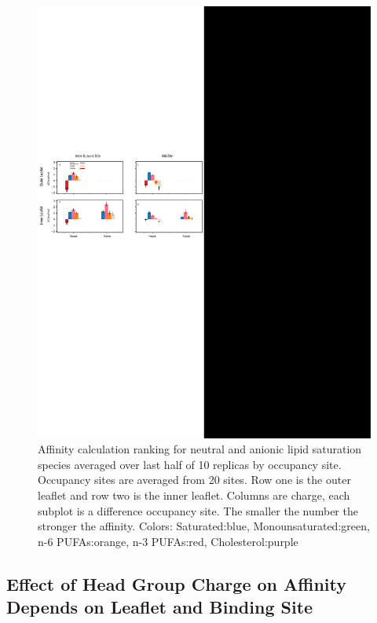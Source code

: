 \begin{figure}[!h]
	\center
	\includegraphics[width=\linewidth]{Figures/Lipid_centric.pdf}
	\caption[Affinity calculation ranking for neutral and anionic lipid saturation species averaged over last half of 10 replicas by occupancy site.] {Affinity calculation ranking for neutral and anionic lipid saturation species averaged over last half of 10 replicas by occupancy site. Occupancy sites are averaged from 20 sites. Row one is the outer leaflet and row two is the inner leaflet. Columns are charge, each subplot is a difference occupancy site. The smaller the number the stronger the affinity. Colors: Saturated:blue, Monounsaturated:green, n-6 PUFAs:orange, n-3 PUFAs:red, Cholesterol:purple}
	\label{fig:lipidBar}
\end{figure}

\subsection{Effect of Head Group Charge on Affinity Depends on Leaflet and Binding Site}

